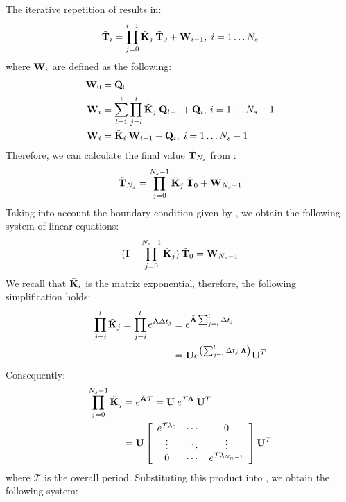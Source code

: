 The iterative repetition of  results in:
\begin{equation} \label{eq:y-recurrent}
  \tilde{\mathbf{T}}_i = \prod_{j = 0}^{i - 1} \tilde{\mathbf{K}}_j \: \tilde{\mathbf{T}}_0 + \mathbf{W}_{i - 1}, \; i = 1 \dots N_s
\end{equation}
where $\mathbf{W}_i$ are defined as the following:
\begin{align}
  \mathbf{W}_0 & = \mathbf{Q}_0 \nonumber \\
  \mathbf{W}_i & = \sum_{l = 1}^i \prod_{j = l}^i \tilde{\mathbf{K}}_j \: \mathbf{Q}_{l - 1} + \mathbf{Q}_i, \: i = 1 \dots N_s - 1 \nonumber \\
  \mathbf{W}_i & = \tilde{\mathbf{K}}_i \: \mathbf{W}_{i - 1} + \mathbf{Q}_i, \; i = 1 \dots N_s - 1 \label{eq:p-recurrent}
\end{align}
Therefore, we can calculate the final value $\tilde{\mathbf{T}}_{N_s}$ from :
\[
  \tilde{\mathbf{T}}_{N_s} = \prod_{j = 0}^{N_s - 1} \tilde{\mathbf{K}}_j \: \tilde{\mathbf{T}}_0 + \mathbf{W}_{N_s - 1}
\]
Taking into account the boundary condition given by , we obtain the following system of linear equations:
\begin{equation} \label{eq:core-system}
  (\mathbf{I} - \prod_{j = 0}^{N_s - 1} \tilde{\mathbf{K}}_j) \: \tilde{\mathbf{T}}_0 = \mathbf{W}_{N_s - 1}
\end{equation}
We recall that $\tilde{\mathbf{K}}_i$ is the matrix exponential, therefore, the following simplification holds:
\begin{align*}
  \prod_{j = i}^l \tilde{\mathbf{K}}_j = \prod_{j = i}^l e^{\tilde{\mathbf{A}} \Delta t_j} & = e^{\tilde{\mathbf{A}} \sum_{j = i}^l \Delta t_j} \\
  & = \mathbf{U} e^{\left( \sum_{j = i}^l \Delta t_j \: \mathbf{\Lambda} \right)} \mathbf{U}^T
\end{align*}
Consequently:
\begin{align*}
  \prod_{j = 0}^{N_s - 1} \tilde{\mathbf{K}}_j & = e^{\tilde{\mathbf{A}} \mathcal{T}} = \mathbf{U} \: e^{\mathcal{T} \mathbf{\Lambda}} \: \mathbf{U}^T \\
    & = \mathbf{U} \left[
      \begin{array}{ccc}
        e^{\mathcal{T} \lambda_0} & \cdots & 0 \\
        \vdots & \ddots & \vdots \\
        0 & \cdots & e^{\mathcal{T} \lambda_{N_n - 1}}
      \end{array}
    \right] \mathbf{U}^T
\end{align*}
where $\mathcal{T}$ is the overall period. Substituting this product into , we obtain the following system:
